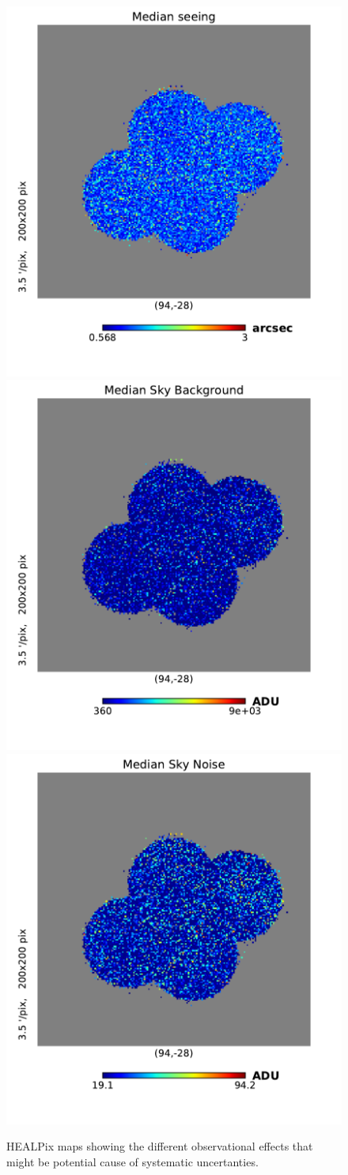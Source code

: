 \documentclass[\docopts]{\docclass}
\begin{document}
\begin{figure}
\centering
\includegraphics[width=0.7\columnwidth]{median_seeing_2048.pdf}
\includegraphics[width=0.7\columnwidth]{median_skybg_2048.pdf}
\includegraphics[width=0.7\columnwidth]{median_skynoise_2048.pdf}
\caption{HEALPix maps showing the different observational effects that might be potential cause of systematic uncertanties.}
\label{fig:systematic_maps}
\end{figure}
\end{document}
